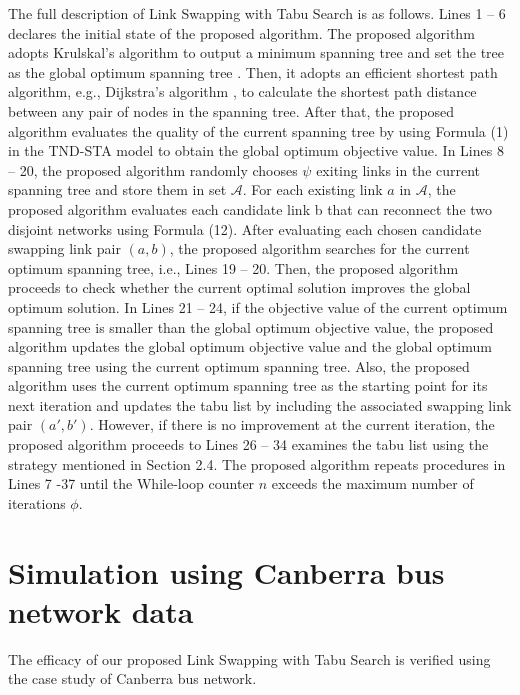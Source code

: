 \documentclass[10pt,english]{article}
\begin{document}
The full description of Link Swapping with Tabu Search is as follows. 
Lines 1 -- 6 declares the initial state of the proposed algorithm. 
The proposed algorithm adopts Krulskal's algorithm to output a minimum spanning tree and set the tree as the global optimum spanning tree \citep{Oncan2008, Rothlauf2009}.
Then, it adopts an efficient shortest path algorithm, e.g., Dijkstra's algorithm \citep{Knuth1977, Wang2020}, to calculate the shortest path distance between any pair of nodes in the spanning tree. 
After that, the proposed algorithm evaluates the quality of the current spanning tree by using Formula (1) in the TND-STA model to obtain the global optimum objective value. In Lines 8 -- 20, the proposed algorithm randomly chooses $\psi$ exiting links in the current spanning tree and store them in set $\mathcal{A}$. 
For each existing link $a$ in $\mathcal{A}$, the proposed algorithm evaluates each candidate link b that can reconnect the two disjoint networks using Formula (12). 
After evaluating each chosen candidate swapping link pair $(a,b)$, the proposed algorithm searches for the current optimum spanning tree, i.e., Lines 19 -- 20. Then, the proposed algorithm proceeds to check whether the current optimal solution improves the global optimum solution. 
In Lines 21 -- 24, if the objective value of the current optimum spanning tree is smaller than the global optimum objective value, the proposed algorithm updates the global optimum objective value and the global optimum spanning tree using the current optimum spanning tree. 
Also, the proposed algorithm uses the current optimum spanning tree as the starting point for its next iteration and updates the tabu list by including the associated swapping link pair $(a',b')$. 
However, if there is no improvement at the current iteration, the proposed algorithm proceeds to Lines 26 -- 34 examines the tabu list using the strategy mentioned in Section 2.4. 
The proposed algorithm repeats procedures in Lines 7 -37 until the While-loop counter $n$ exceeds the maximum number of iterations $\phi$.

\section{Simulation using Canberra bus network data}
The efficacy of our proposed Link Swapping with Tabu Search is verified using the case study of Canberra bus network.
\end{document}
